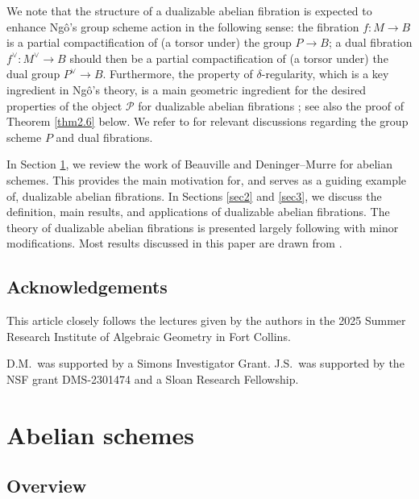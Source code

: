 \documentclass[11pt]{amsart}
\theoremstyle{plain}
\theoremstyle{definition}
\theoremstyle{remark}
\newcommand{\CP}{{\mathcal P}}
\begin{document}
We note that the structure of a dualizable abelian fibration is expected to enhance Ng\^o's group scheme action in the following sense: the fibration $f: M \to B$ is a partial compactification of (a torsor under) the group $P \to B$; a dual fibration $f^\vee: M^\vee \to B$ should then be a partial compactification of (a torsor under) the dual group $P^\vee \to B$. Furthermore, the property of $\delta$-regularity, which is a key ingredient in Ng\^o's theory, is a main geometric ingredient for the desired properties of the object $\CP$ for dualizable abelian fibrations \cite{MSY}; see also the proof of Theorem \ref{thm2.6} below. We refer to \cite{AF, Kim0, Kim} for relevant discussions regarding the group scheme $P$ and dual fibrations.



In Section \ref{sec1}, we review the work of Beauville \cite{B} and Deninger–Murre \cite{DM} for abelian schemes. This provides the main motivation for, and serves as a guiding example of, dualizable abelian fibrations. In Sections \ref{sec2} and \ref{sec3}, we discuss the definition, main results, and applications of dualizable abelian fibrations. The theory of dualizable abelian fibrations is presented largely following \cite{MSY} with minor modifications. Most results discussed in this paper are drawn from \cite{MSY, MSY2, Ghosh, BMSY1, BMSY2}.



\subsection{Acknowledgements}
This article closely follows the lectures given by the authors in the 2025 Summer Research Institute of Algebraic Geometry in Fort Collins.


D.M.~was supported by a Simons Investigator Grant.
J.S.~was supported by the NSF grant DMS-2301474 and a Sloan Research Fellowship.







\section{Abelian schemes}\label{sec1}


\subsection{Overview}
\end{document}
